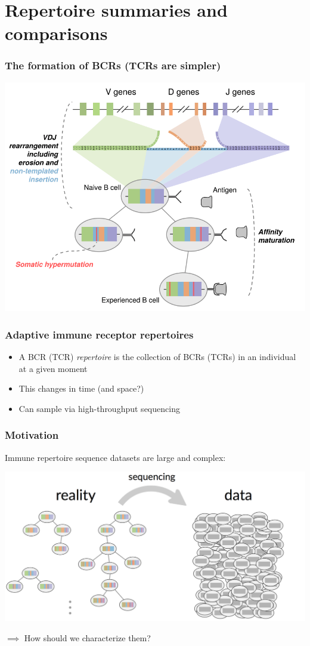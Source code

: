 \documentclass[mathserif,compress]{beamer}
\renewcommand\;{\,}
\begin{document}
\section{Repertoire summaries and comparisons}

\begin{frame}\frametitle{The formation of BCRs (TCRs are simpler)}
\begin{center}
\includegraphics[width=\linewidth]{Images/BCRFormation.png}
\end{center}
\end{frame}

\begin{frame}\frametitle{Adaptive immune receptor repertoires}
\begin{itemize}
\item[]
A BCR (TCR) \emph{repertoire} is the collection of BCRs (TCRs) in an individual at a given moment
\bigskip
\item[]
This changes in time (and space?)
\bigskip
\item[]
Can sample via high-throughput sequencing
\end{itemize}
\end{frame}

\begin{frame}\frametitle{Motivation}
Immune repertoire sequence datasets are large and complex:
\begin{center}
\includegraphics[width=\linewidth]{Images/reality-data.png}
\end{center}
$\implies$ How should we characterize them?
\end{frame}
\end{document}
